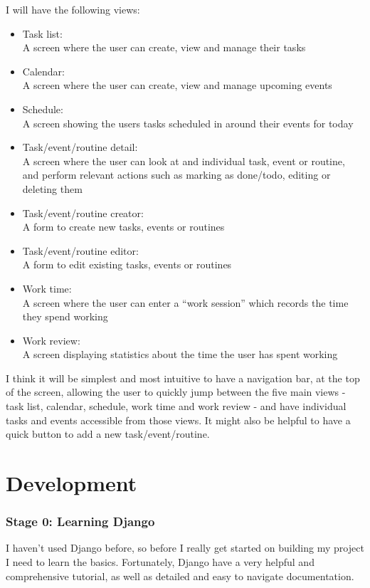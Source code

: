 \documentclass{article}
\begin{document}
I will have the following views:
\begin{itemize}
\item Task list:\\
  A screen where the user can create, view and manage their tasks
\item Calendar:\\
  A screen where the user can create, view and manage upcoming events
\item Schedule:\\
  A screen showing the users tasks scheduled in around their events for today
\item Task/event/routine detail:\\
  A screen where the user can look at and individual task, event or routine,
  and perform relevant actions such as marking as done/todo,
  editing or deleting them
\item Task/event/routine creator:\\
  A form to create new tasks, events or routines
\item Task/event/routine editor:\\
  A form to edit existing tasks, events or routines
\item Work time:\\
  A screen where the user can enter a ``work session'' which records the time they spend working
\item Work review:\\
  A screen displaying statistics about the time the user has spent working
\end{itemize}

I think it will be simplest and most intuitive to have a navigation bar,
at the top of the screen,
allowing the user to quickly jump between the five main views -
task list, calendar, schedule, work time and work review -
and have individual tasks and events accessible from those views.
It might also be helpful to have a quick button to add a new task/event/routine.

\part{Development}
\section{Stage 0: Learning Django}
I haven't used Django before,
so before I really get started on building my project I need to learn the basics.
Fortunately, Django have a very helpful and comprehensive tutorial,
as well as detailed and easy to navigate documentation.
\end{document}
